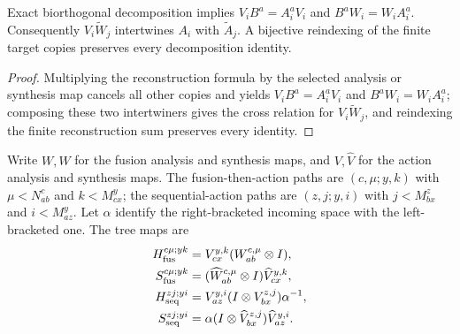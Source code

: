 \begin{lemma}
    \label{thm:glm_boundary_target_intertwiners}
    \leanok
    Exact biorthogonal decomposition implies
    $V_iB^a=A_i^aV_i$ and $B^aW_i=W_iA_i^a$.
    Consequently $V_i\widetilde W_j$ intertwines $A_i$ with
    $\widetilde A_j$. A bijective reindexing of the finite target copies
    preserves every decomposition identity.
\end{lemma}
\begin{proof}
    \leanok
    Multiplying the reconstruction formula by the selected analysis or
    synthesis map cancels all other copies and yields $V_iB^a=A_i^aV_i$ and
    $B^aW_i=W_iA_i^a$; composing these two intertwiners gives the cross
    relation for $V_i\widetilde W_j$, and reindexing the finite reconstruction
    sum preserves every identity.
\end{proof}

\begin{definition}
    \label{def:glm_boundary_action_trees}
    \leanok
    Write $W,\widehat W$ for the fusion analysis and synthesis maps, and
    $V,\widehat V$ for the action analysis and synthesis maps. The
    fusion-then-action paths are
    $(c,\mu;y,k)$ with $\mu<N_{ab}^c$ and $k<M_{cx}^y$; the
    sequential-action paths are
    $(z,j;y,i)$ with $j<M_{bx}^z$ and $i<M_{az}^y$.
    Let $\alpha$ identify the right-bracketed incoming space with the left-bracketed one.
    The tree maps are
    \begin{align}
        H_{\rm fus}^{c\mu;yk} & =V_{cx}^{y,k}(W_{ab}^{c,\mu}\otimes I),                      \\
        S_{\rm fus}^{c\mu;yk} & =(\widehat W_{ab}^{c,\mu}\otimes I)\widehat V_{cx}^{y,k},
        \label{eq:glm_boundary_fusion_action_maps}                                           \\
        H_{\rm seq}^{zj;yi}   & =V_{az}^{y,i}(I\otimes V_{bx}^{z,j})\alpha^{-1},             \\
        S_{\rm seq}^{zj;yi}   & =\alpha(I\otimes\widehat V_{bx}^{z,j})\widehat V_{az}^{y,i}.
        \label{eq:glm_boundary_sequential_action_maps}
    \end{align}
\end{definition}

